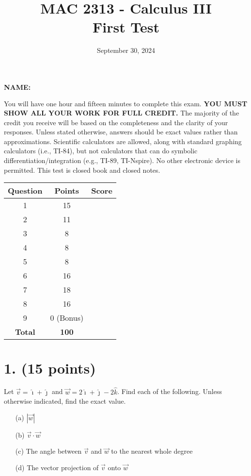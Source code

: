 \documentclass[12pt]{article}
\title{MAC 2313 - Calculus III\\First Test}
\date{September 30, 2024}
\author{}
\begin{document}
\maketitle

\noindent
\textbf{NAME:} \hrulefill

\vspace{1em}

\noindent
You will have one hour and fifteen minutes to complete this exam. \textbf{YOU MUST SHOW ALL YOUR WORK FOR FULL CREDIT.} The majority of the credit you receive will be based on the completeness and the clarity of your responses. Unless stated otherwise, answers should be exact values rather than approximations. Scientific calculators are allowed, along with standard graphing calculators (i.e., TI-84), but not calculators that can do symbolic differentiation/integration (e.g., TI-89, TI-Nspire). No other electronic device is permitted. This test is closed book and closed notes.

\vspace{1em}

\begin{tabular}{|c|c|c|}
\hline
\textbf{Question} & \textbf{Points} & \textbf{Score} \\
\hline
1 & 15 & \\
2 & 11 & \\
3 & 8  & \\
4 & 8  & \\
5 & 8  & \\
6 & 16 & \\
7 & 18 & \\
8 & 16 & \\
9 & 0 (Bonus) & \\
\hline
\textbf{Total} & \textbf{100} & \\
\hline
\end{tabular}

\newpage

\section*{1. (15 points)}

Let $\vec{v} = \hat{\imath} + \hat{\jmath}$ and $\vec{w} = 2\hat{\imath} + \hat{\jmath} - 2\hat{k}$. Find each of the following. Unless otherwise indicated, find the exact value.

\begin{itemize}
    \item[(a)] $|\vec{w}|$
    \item[(b)] $\vec{v} \cdot \vec{w}$
    \item[(c)] The angle between $\vec{v}$ and $\vec{w}$ to the nearest whole degree
    \item[(d)] The vector projection of $\vec{v}$ onto $\vec{w}$
\end{itemize}
\end{document}
